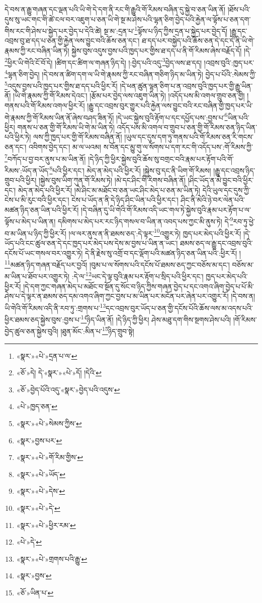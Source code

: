 དེ་བས་ན་རྒྱུ་གཞན་དང་ལྡན་པའི་ཡི་གེ་དེ་དག་ནི་རང་གི་རྒྱུའི་གོ་རིམས་བཞིན་དུ་སྐྱེ་བ་ཅན་ཡིན་ནོ། །ཐོས་པའི་དུས་སུ་ཡང་གང་གི་ཚེ་ངལ་བར་འཇུག་པ་ཅན་ཡི་གེ་སྔ་མ་ཤེས་པའི་ལྷན་ཅིག་བྱེད་པའི་རྐྱེན་ལ་ལྟོས་པ་ཅན་དག་གིས་རང་གི་ཤེས་པ་སྐྱེད་པར་བྱེད་པ་དེའི་ཚེ། སྔ་མ་:དྲན་པ་\footnote{«སྣར་»«པེ་»དྲན་པ་ལ་}ལྟོས་པ་ཉིད་ཀྱིས་དྲན་པ་སྐྱེད་པར་བྱེད་དོ། །རྒྱུ་དང་འབྲས་བུ་ཐ་དད་པ་ཅན་གྱི་རྐྱེན་ལས་བྱུང་བའི་ཆོས་ཅན་དང་། ཐ་དད་པར་བསྐྱེད་པའི་ཆོས་ཅན་དེ་དང་དེ་ནི་ཡི་གེ་རྣམས་ཀྱི་རང་བཞིན་ཡིན་ཏེ། སྐྱེས་བུས་འདུས་བྱས་པའི་ཁྱད་པར་གྱིས་ཐ་དད་པ་ནི་གོ་རིམས་ཞེས་བརྗོད་དོ། །དེ་\footnote{«ཅོ་»དེ། དེ་«སྣར་»«པེ་»དོ། །དེའི་}ཕྱིར་ཡི་གེའི་ངོ་བོ་དེ། །ཚིག་དང་ཚིག་ལ་གཞན་ཉིད་དེ། །:བྱེད་པའི་འདུ་\footnote{«ཅོ་»བྱེད་པོའི་འདུ་«སྣར་»བྱེད་པའི་འདུས་}བྱེད་ལས་ཐ་དད། །འབྲས་བུའི་:ཁྱད་པར་\footnote{«པེ་»ཁྱད་ཅན་}ལྷན་ཅིག་བྱེད། །དེ་བས་ན་ཚིག་དག་ལ་ཡི་གེ་རྣམས་ཀྱི་རང་བཞིན་གཅིག་ཉིད་མ་ཡིན་ཏེ། བྱེད་པ་པོའི་:སེམས་ཀྱི་\footnote{«སྣར་»«པེ་»སེམས་ཀྱིས་}འདུས་བྱས་པའི་ཁྱད་པར་གྱིས་ཐ་དད་པའི་ཕྱིར་རོ། །དེ་ཕན་ཚུན་ལྷན་ཅིག་པ་ན་འབྲས་བུའི་ཁྱད་པར་གྱི་རྒྱུ་ཡིན་ནོ། །ཡི་གེ་རྣམས་ཀྱི་གོ་རིམས་དེའང་། །རྩོམ་པར་བྱེད་ལས་འཇུག་ཡིན་ཏེ། །འདོད་པས་མི་འགལ་གྲུབ་ཅན་གྱི། །གནས་པའི་གོ་རིམས་འགལ་ཕྱིར་རོ། །རྒྱུ་དང་འབྲས་བུར་གྱུར་པའི་རྐྱེན་ལས་བྱུང་བའི་རང་བཞིན་གྱི་ཁྱད་པར་ཡི་གེ་རྣམས་ཀྱི་གོ་རིམས་ཡིན་ནོ་ཞེས་བཤད་ཟིན་ཏོ། །དེ་ཡང་སྐྱེས་བུའི་རྟོག་པ་དང་དཔྱོད་པས་:བྱས་པ་\footnote{«སྣར་»བྱས་པར་}ཡིན་པའི་ཕྱིར། གནས་པ་ཅན་གྱི་གོ་རིམས་ཡི་གེ་མ་ཡིན་ཏེ། འདོད་པས་མི་འགལ་བ་གྲུབ་པ་ཅན་གྱི་གོ་རིམས་ཅན་ཉིད་ཡིན་པའི་ཕྱིར་ཏེ། ལས་ཀྱི་ཁྱད་པར་གྱི་གོ་རིམས་བཞིན་ནོ། །ཡུལ་དང་དུས་དག་ཏུ་གནས་པའི་གོ་རིམས་ཅན་རི་གངས་ཅན་དང་། འབིགས་བྱེད་དང་། མ་ལ་ཡའམ། ས་བོན་དང་མྱུ་གུ་ལ་སོགས་པ་དག་རང་གི་འདོད་པས་:གོ་རིམས་ཀྱི་\footnote{«སྣར་»«པེ་»གོ་རིམ་གྱིས་}བཀོད་པ་བྱ་བར་ནུས་པ་མ་ཡིན་ནོ། །དེ་ཉིད་ཀྱི་ཕྱིར་སྐྱེས་བུའི་ཆོས་སུ་བགྲང་བའི་རྣམ་པར་རྟོག་པའི་གོ་རིམས་:ཡོད་ན་ཡོད་\footnote{«སྣར་»«པེ་»ཡོད་}པའི་ཕྱིར་དང་། མེད་ན་མེད་པའི་ཕྱིར་རོ། །སྐྱེས་བུ་དང་ནི་ཡིག་གོ་རིམས། །རྒྱུ་དང་འབྲས་ཉིད་གྲུབ་པའི་ཕྱིར། །སྐྱེས་བུས་ཡིག་ཀུན་གོ་རིམས་ཏེ། །མེ་དང་ཤིང་གི་རིགས་བཞིན་ནོ། །ཤིང་ཡོད་ན་མེ་བྱུང་བའི་ཕྱིར་དང་། མེད་ན་མེད་པའི་ཕྱིར་རོ། །མེ་ཤིང་མ་མཐོང་བ་ཅན་ཡང་ཤིང་མེད་པ་ཅན་མ་ཡིན་ཏེ། དེའི་ཡུལ་དང་དུས་ཀྱི་ངེས་པ་མི་རུང་བའི་ཕྱིར་དང་། ངེས་པ་ཡོད་ན་ནི་དེ་ཉིད་ཤིང་ཡིན་པའི་ཕྱིར་དང་། ཤིང་ནི་མེའི་ཉེ་བར་ལེན་པའི་མཚན་ཉིད་ཅན་ཡིན་པའི་ཕྱིར་རོ། །དེ་བཞིན་དུ་ཡི་གེའི་གོ་རིམས་འདི་ཡང་གལ་ཏེ་སྐྱེས་བུའི་རྣམ་པར་རྟོག་པ་ལ་ལྟོས་པ་མེད་པ་ཡིན་ན། དམིགས་པ་མེད་པར་རང་ཉིད་གསལ་བ་ཡིན་ན་འབད་པས་ཀྱང་མི་ནུས་ཏེ། དེ་\footnote{«སྣར་»«པེ་»དེས་}རབ་ཏུ་ཕྱེ་བ་མ་ཡིན་པ་ཉིད་ཀྱི་ཕྱིར་རོ། །ལ་ལར་ནུས་ན་ནི་ཐམས་ཅད་:དེ་ལྟར་\footnote{«སྣར་»«པེ་»དེ་}འགྱུར་ཏེ། ཁྱད་པར་མེད་པའི་ཕྱིར་རོ། །དེ་ཡོད་པའི་ངང་ཚུལ་ཅན་དེ་དང་ཁྱད་པར་མེད་པས་དེས་མ་བྱས་པ་ཡིན་ན་ཡང་། ཐམས་ཅད་ལ་རྒྱུ་དང་འབྲས་བུའི་དངོས་པོ་ཡང་གསལ་བར་འགྱུར་ཏེ། དེ་ནི་རྗེས་སུ་འགྲོ་བ་དང་ལྡོག་པའི་མཚན་ཉིད་ཅན་ཡིན་པའི་:ཕྱིར་རོ། །\footnote{«སྣར་»«པེ་»ཕྱིར་རམ་}མཚན་ཉིད་གཞན་བརྗོད་པར་བྱའོ། །བུམ་པ་ལ་སོགས་པའི་དངོས་པོ་ཐམས་ཅད་ཀྱང་བཅོས་མ་དང་། བཅོས་མ་མ་ཡིན་པ་ཐོབ་པར་འགྱུར་ཏེ། :དེ་ལ་\footnote{«པེ་»དེ་}ཡང་དེ་ལྟ་བུའི་རྣམ་པར་རྟོག་པ་སྲིད་པའི་ཕྱིར་དང་། ཁྱད་པར་མེད་པའི་ཕྱིར་རོ། །དེ་དག་ཀྱང་གཞན་མེད་པ་མཐོང་བ་སྔོན་དུ་སོང་བ་ཉིད་ཀྱིས་གཞན་བྱེད་པ་དང་འགའ་ཞིག་བྱེད་པ་པོ་མི་ཤེས་པ་དེ་ལྟར་ན་ཐམས་ཅད་དམ་འགའ་ཞིག་ཀྱང་བྱས་པ་མ་ཡིན་པར་མངོན་པར་ཞེན་པར་འགྱུར་རོ། །དེ་བས་ན། ཡི་གེའི་གོ་རིམས་འདི་ནི་རབ་ཏུ་:གྲགས་པ་\footnote{«སྣར་»«པེ་»གྲགས་པའི་རྒྱུ་}དང་འབྲས་བུར་ཡོད་པ་ཅན་གྱི་དངོས་པོའི་ཆོས་ལས་མ་འདས་པའི་ཕྱིར་ཐམས་ཅད་སྐྱེས་བུས་:བྱས་པ་\footnote{«སྣར་»བྱས་}ཉིད་ཡིན་ནོ། །དེ་ཉིད་ཀྱི་ཕྱིར། ཤེས་མཐུ་དག་གིས་སྔགས་ཤེས་པའི། །གོ་རིམས་བྱེད་ཚུལ་ཅན་སྐྱེས་བུའི། །ཐུན་མོང་:མིན་པ་\footnote{«ཅོ་»ཡིན་པ་}ཉིད་གྲུབ་སྟེ། 